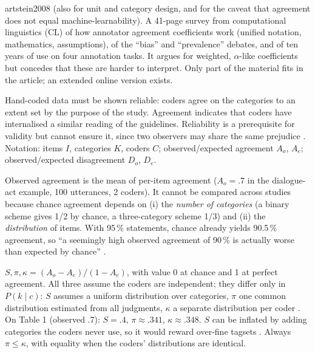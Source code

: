 \begin{papercard}{artstein2008}
  (also  for unit and category design, and  for the caveat that agreement does not equal machine-learnability). A 41-page survey from computational linguistics (CL) of how annotator agreement coefficients work (unified notation, mathematics, assumptions), of the ``bias'' and ``prevalence'' debates, and of ten years of use on four annotation tasks. It argues for weighted, $\alpha$-like coefficients but concedes that these are harder to interpret. Only part of the material fits in the article; an extended online version exists.

 Hand-coded data must be shown reliable: coders agree on the categories to an extent set by the purpose of the study. Agreement indicates that coders have internalised a similar reading of the guidelines. Reliability is a prerequisite for validity but cannot ensure it, since two observers may share the same prejudice . Notation: items $I$, categories $K$, coders $C$; observed/expected agreement $A_o$, $A_e$; observed/expected disagreement $D_o$, $D_e$.

 Observed agreement is the mean of per-item agreement ($A_o=.7$ in the dialogue-act example, 100 utterances, 2 coders). It cannot be compared across studies because chance agreement depends on (i) the \emph{number of categories} (a binary scheme gives 1/2 by chance, a three-category scheme 1/3) and (ii) the \emph{distribution} of items. With 95\,\% statements, chance already yields 90.5\,\% agreement, so ``a seemingly high observed agreement of 90\,\% is actually worse than expected by chance'' .

 $S,\pi,\kappa=(A_o-A_e)/(1-A_e)$, with value 0 at chance and 1 at perfect agreement. All three assume the coders are independent; they differ only in $P(k\mid c)$: $S$ assumes a uniform distribution over categories, $\pi$ one common distribution estimated from all judgments, $\kappa$ a separate distribution per coder . On Table 1 (observed .7): $S=.4$, $\pi\approx.341$, $\kappa\approx.348$. $S$ can be inflated by adding categories the coders never use, so it would reward over-fine tagsets . Always $\pi\le\kappa$, with equality when the coders' distributions are identical.


\end{papercard}
